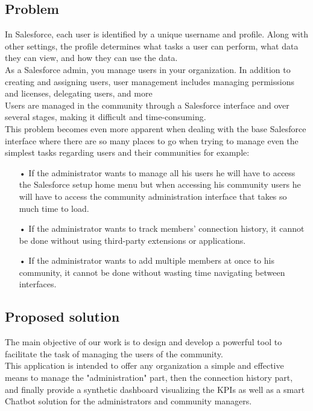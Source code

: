 \subsection{Problem}
In Salesforce, each user is identified by a unique username and profile. Along with other settings, the profile determines what tasks a user can perform, what data they can view, and how they can use the data.\\
As a Salesforce admin, you manage users in your organization. In addition to creating and assigning users, user management includes managing permissions and licenses, delegating users, and more \\

Users are managed in the community through a Salesforce interface and over several stages, making it difficult and time-consuming.\\
This problem becomes even more apparent when dealing with the base Salesforce interface where there are so many places to go when trying to manage even the simplest tasks regarding users and their communities for example:
\begin{itemize}
\item[•] If the administrator wants to manage all his users he will have to access the Salesforce setup home menu but when accessing his community users he will have to access the community administration interface that takes so much time to load.
\item[•] If the administrator wants to track members’ connection history, it cannot be done without using third-party extensions or applications.
\item[•] If the administrator wants to add multiple members at once to his community, it cannot be done without wasting time navigating between interfaces.
\end{itemize}
 

\subsection{Proposed solution}
The main objective of our work is to design and develop a powerful tool to facilitate the task of managing the users of the community.\\
This application is intended to offer any organization a simple and effective means to manage the "administration" part, then the connection history part, and finally provide a synthetic dashboard visualizing the KPIs as well as a smart Chatbot solution for the administrators and community managers.
